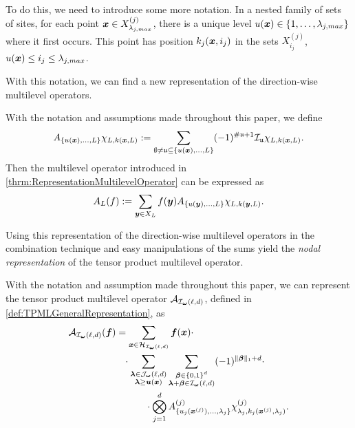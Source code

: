 \documentclass[	a4paper, 
								11pt]{article}
\theoremstyle{plain}
\begin{document}
To do this, we need to introduce some more notation. In a nested family of sets of sites, for each point $ \boldsymbol{x} \in X^{(j)}_{\lambda_{j,max}} $, there is a unique level $ u(\boldsymbol{x}) \in \{1, \dots, \lambda_{j,max} \} $ where it first occurs. This point has position $ k_j(\boldsymbol{x},i_j) $ in the sets $ X^{(j)}_{i_j} $, $ u(\boldsymbol{x}) \leq i_j \leq \lambda_{j,max} $.

With this notation, we can find a new representation of the direction-wise multilevel operators.

\begin{theorem}\label{thrm:NodalRepresentationMultilevel}
With the notation and assumptions made throughout this paper, we define
\begin{align*}
    A_{\{u(\boldsymbol{x}), \dots, L\}} \chi_{L,k(\boldsymbol{x},L)} := \sum_{\emptyset \neq \mathfrak{u} \subseteq\{ u(\boldsymbol{x}), \dots, L \}} (-1)^{\#\mathfrak{u} + 1} \mathcal{I}_{\mathfrak{u}} \chi_{L,k(\boldsymbol{x},L)}.
\end{align*}
Then the multilevel operator introduced in \cref{thrm:RepresentationMultilevelOperator} can be expressed as
\begin{align*}
    A_L(f) := \sum_{\boldsymbol{y} \in X_L} f(\boldsymbol{y}) A_{\{u(\boldsymbol{y}), \dots, L\}} \chi_{L,k(\boldsymbol{y},L)}.
\end{align*}
\end{theorem}

Using this representation of the direction-wise multilevel operators in the combination technique and easy manipulations of the sums yield the \emph{nodal representation} of the tensor product multilevel operator.

\begin{theorem}\label{thrm:NodalRepresentationTPML}
    With the notation and assumption made throughout this paper, we can represent the tensor product multilevel operator $ \mathcal{A}_{\mathcal{I}_{\boldsymbol{\omega}}(\ell,d)} $, defined in \cref{def:TPMLGeneralRepresentation}, as
    \begin{align*}
        \mathcal{A}_{\mathcal{I}_{\boldsymbol{\omega}}(\ell,d)}(\boldsymbol{f}) &= \sum_{\boldsymbol{x} \in \mathcal{H}_{\mathcal{I}_{\boldsymbol{\omega}}(\ell,d)}} \boldsymbol{f}(\boldsymbol{x}) \cdot \\
        &\phantom{=} \cdot\sum_{\substack{\boldsymbol{\lambda} \in \mathcal{J}_{\boldsymbol{\omega}}(\ell,d) \\ \boldsymbol{\lambda} \geq \boldsymbol{u}(\boldsymbol{x})}} \sum_{\substack{\boldsymbol{\beta} \in \{0,1 \}^d \\ \boldsymbol{\lambda} + \boldsymbol{\beta} \in \mathcal{I}_{\boldsymbol{\omega}}(\ell,d)}} (-1)^{\| \boldsymbol{\beta}\|_1 + d} \cdot \\
        &\phantom{\sum \sum} \cdot \bigotimes_{j=1}^{d} A^{(j)}_{\{u_j(\boldsymbol{x}^{(j)}), \dots, \lambda_j \}} \chi^{(j)}_{\lambda_j,k_j(\boldsymbol{x}^{(j)},\lambda_j)}.
    \end{align*}
\end{theorem}
\end{document}
